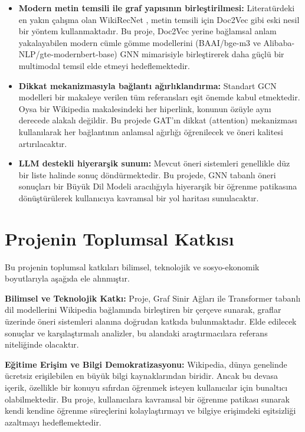 \documentclass[12pt, a4paper]{article}
\begin{document}
\begin{itemize}
    \item \textbf{Modern metin temsili ile graf yapısının birleştirilmesi:} Literatürdeki en yakın çalışma olan WikiRecNet \cite{wikirecnet2020}, metin temsili için Doc2Vec gibi eski nesil bir yöntem kullanmaktadır. Bu proje, Doc2Vec yerine bağlamsal anlam yakalayabilen modern cümle gömme modellerini (BAAI/bge-m3 ve Alibaba-NLP/gte-modernbert-base) GNN mimarisiyle birleştirerek daha güçlü bir multimodal temsil elde etmeyi hedeflemektedir.

    \item \textbf{Dikkat mekanizmasıyla bağlantı ağırlıklandırma:} Standart GCN modelleri bir makaleye verilen tüm referansları eşit önemde kabul etmektedir. Oysa bir Wikipedia makalesindeki her hiperlink, konunun özüyle aynı derecede alakalı değildir. Bu projede GAT'ın dikkat (attention) mekanizması kullanılarak her bağlantının anlamsal ağırlığı öğrenilecek ve öneri kalitesi artırılacaktır.

    \item \textbf{LLM destekli hiyerarşik sunum:} Mevcut öneri sistemleri genellikle düz bir liste halinde sonuç döndürmektedir. Bu projede, GNN tabanlı öneri sonuçları bir Büyük Dil Modeli aracılığıyla hiyerarşik bir öğrenme patikasına dönüştürülerek kullanıcıya kavramsal bir yol haritası sunulacaktır.
\end{itemize}

\section{Projenin Toplumsal Katkısı}

Bu projenin toplumsal katkıları bilimsel, teknolojik ve sosyo-ekonomik boyutlarıyla aşağıda ele alınmıştır.

\textbf{Bilimsel ve Teknolojik Katkı:}
Proje, Graf Sinir Ağları ile Transformer tabanlı dil modellerini Wikipedia bağlamında birleştiren bir çerçeve sunarak, graflar üzerinde öneri sistemleri alanına doğrudan katkıda bulunmaktadır. Elde edilecek sonuçlar ve karşılaştırmalı analizler, bu alandaki araştırmacılara referans niteliğinde olacaktır.

\textbf{Eğitime Erişim ve Bilgi Demokratizasyonu:}
Wikipedia, dünya genelinde ücretsiz erişilebilen en büyük bilgi kaynaklarından biridir. Ancak bu devasa içerik, özellikle bir konuyu sıfırdan öğrenmek isteyen kullanıcılar için bunaltıcı olabilmektedir. Bu proje, kullanıcılara kavramsal bir öğrenme patikası sunarak kendi kendine öğrenme süreçlerini kolaylaştırmayı ve bilgiye erişimdeki eşitsizliği azaltmayı hedeflemektedir.
\end{document}
